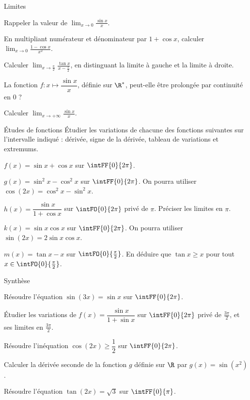 \begin{exercice}[2]{Limites}
\begin{questions}
  \item Rappeler la valeur de $\displaystyle\lim_{x\to0}\frac{\sin x}{x}$.
  \item En multipliant numérateur et dénominateur par $1+\cos x$, calculer $\displaystyle\lim_{x\to0}\frac{1-\cos x}{x^{2}}$.
  \item Calculer $\displaystyle\lim_{x\to\frac{\pi}{2}}\frac{\tan x}{x-\frac{\pi}{2}}$, en distinguant la limite à gauche et la limite à droite.
  \item La fonction $f:x\mapsto\dfrac{\sin x}{x}$, définie sur $\R^{*}$, peut-elle être prolongée par continuité en $0$ ?
  \item Calculer $\displaystyle\lim_{x\to+\infty}\frac{\sin x}{x}$.
\end{questions}
\end{exercice}


\begin{exercice}[3]{Études de fonctions}
Étudier les variations de chacune des fonctions suivantes sur l'intervalle indiqué : dérivée, signe de la dérivée,
tableau de variations et extremums.
\begin{questions}
  \item $f(x)=\sin x+\cos x$ sur $\intFF{0}{2\pi}$.
  \item $g(x)=\sin^{2}x-\cos^{2}x$ sur $\intFF{0}{2\pi}$. On pourra utiliser $\cos(2x)=\cos^{2}x-\sin^{2}x$.
  \item $h(x)=\dfrac{\sin x}{1+\cos x}$ sur $\intFO{0}{2\pi}$ privé de $\pi$. Préciser les limites en $\pi$.
  \item $k(x)=\sin x\cos x$ sur $\intFF{0}{2\pi}$. On pourra utiliser $\sin(2x)=2\sin x\cos x$.
  \item $m(x)=\tan x-x$ sur $\intFO{0}{\frac{\pi}{2}}$. En déduire que $\tan x\geq x$ pour tout $x\in\intFO{0}{\frac{\pi}{2}}$.
\end{questions}
\end{exercice}

\begin{exercice}[3]{Synthèse}
\begin{questions}
  \item Résoudre l'équation $\sin(3x)=\sin x$ sur $\intFF{0}{2\pi}$.
  \item Étudier les variations de $f(x)=\dfrac{\sin x}{1+\sin x}$ sur $\intFF{0}{2\pi}$ privé de $\frac{3\pi}{2}$, et ses limites en $\frac{3\pi}{2}$.
  \item Résoudre l'inéquation $\cos(2x)\geq\dfrac12$ sur $\intFF{0}{2\pi}$.
  \item Calculer la dérivée seconde de la fonction $g$ définie sur $\R$ par $g(x)=\sin\left(x^{2}\right)$.
  \item Résoudre l'équation $\tan(2x)=\sqrt3$ sur $\intFF{0}{\pi}$.
\end{questions}
\end{exercice}

